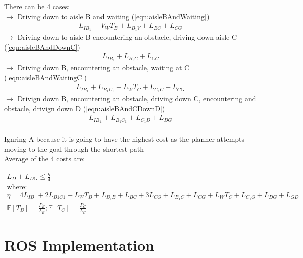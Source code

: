 \documentclass[a4paper,12pt]{article}
\begin{document}
		There can be 4 cases:\\
		 $\rightarrow$ Driving down to aisle B and waiting (\ref{eqn:aisleBAndWaiting})
		\begin{equation}
			\begin{split}
			L_{IB_1}+V_WT_B+L_{B_1V}+L_{BC}+L_{CG}
			\end{split}
			\label{eqn:aisleBAndWaiting}
			\end{equation}
		$\rightarrow$ Driving down to aisle B encountering an obstacle, driving down aisle C (\ref{eqn:aisleBAndDownC})
		\begin{equation}
			\begin{split}
			L_{IB_1}+L_{B_1C}+L_{CG}
			\end{split}
			\label{eqn:aisleBAndDownC}
		\end{equation}
		$\rightarrow$ Driving down B, encountering an obstacle, waiting at C (\ref{eqn:aisleBAndWaitingC})
		\begin{equation}
			\begin{split}
			L_{IB_1}+L_{B_1C_1}+L_WT_C+L_{C_1C}+L_{CG}
			\end{split}
			\label{eqn:aisleBAndWaitingC}
		\end{equation}
		$\rightarrow$ Drivign down B, encountering an obstacle, driving down C, encountering and obstacle, drivign down D (\ref{eqn:aisleBAndCDownD})
		\begin{equation}
			\begin{split}
			L_{IB_1}+L_{B_1C_1}+L_{C_1D}+L_{DG}
			\end{split}
			\label{eqn:aisleBAndCDownD}
		\end{equation}
		\\
		Ignring A because it is going to have the highest cost as the planner attempts moving to the goal through the shortest path
		\\
		Average of the 4 costs are:

		\begin{equation}
			\begin{split}
			L_D+L_{DG} \leq \frac{\eta}{4}\\
			\text{where:} \\
			\eta = 4L_{IB_1}+2L_{B1C1}+L_WT_B+L_{B_1B}+L_{BC}+3L_{CG}+L_{B_1C}+L_{CG}+L_WT_C+L_{C_1G}+L_{DG}+L_{GD}\\
			\mathbb{E}[T_B] = \frac{P_B}{\lambda_B}; \mathbb{E}[T_C]=\frac{P_C}{\lambda_C}
			\end{split}
			\label{eqn:costAverage}
		\end{equation}


	
	\section{ROS Implementation}

		

	
	
	


	\newpage
	\appendix
	\appendixpage
	\addappheadtotoc
	
\end{document}
